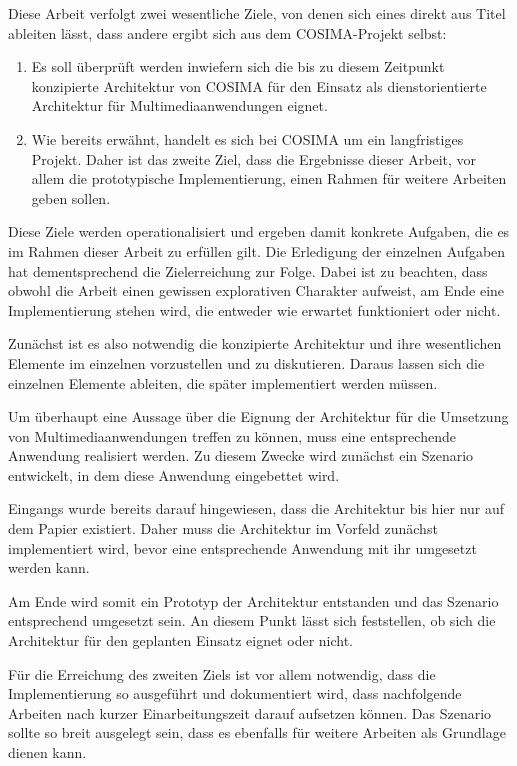   Diese Arbeit verfolgt zwei wesentliche Ziele, von denen sich eines direkt aus Titel ableiten lässt, dass andere ergibt sich aus dem COSIMA-Projekt selbst:

  \begin{enumerate}
    \item Es soll überprüft werden inwiefern sich die bis zu diesem Zeitpunkt konzipierte Architektur von COSIMA für den Einsatz als dienstorientierte Architektur für Multimediaanwendungen eignet. 
    \item Wie bereits erwähnt, handelt es sich bei COSIMA um ein langfristiges Projekt. Daher ist das zweite Ziel, dass die Ergebnisse dieser Arbeit, vor allem die prototypische Implementierung, einen Rahmen für weitere Arbeiten geben sollen.
  \end{enumerate}
  
  Diese Ziele werden operationalisiert und ergeben damit konkrete Aufgaben, die es im Rahmen dieser Arbeit zu erfüllen gilt. Die Erledigung der einzelnen Aufgaben hat dementsprechend die Zielerreichung zur Folge. Dabei ist zu beachten, dass obwohl die Arbeit einen gewissen explorativen Charakter aufweist, am Ende eine Implementierung stehen wird, die entweder wie erwartet funktioniert oder nicht.
  
  Zunächst ist es also notwendig die konzipierte Architektur und ihre wesentlichen Elemente im einzelnen vorzustellen und zu diskutieren. Daraus lassen sich die einzelnen Elemente ableiten, die später implementiert werden müssen.
  
  Um überhaupt eine Aussage über die Eignung der Architektur für die Umsetzung von Multimediaanwendungen treffen zu können, muss eine entsprechende Anwendung realisiert werden. Zu diesem Zwecke wird zunächst ein Szenario entwickelt, in dem diese Anwendung eingebettet wird.
  
  Eingangs wurde bereits darauf hingewiesen, dass die Architektur bis hier nur auf dem Papier existiert. Daher muss die Architektur im Vorfeld zunächst implementiert wird, bevor eine entsprechende Anwendung mit ihr umgesetzt werden kann.
  
  Am Ende wird somit ein Prototyp der Architektur entstanden und das Szenario entsprechend umgesetzt sein. An diesem Punkt lässt sich feststellen, ob sich die Architektur für den geplanten Einsatz eignet oder nicht.
  
  Für die Erreichung des zweiten Ziels ist vor allem notwendig, dass die Implementierung so ausgeführt und dokumentiert wird, dass nachfolgende Arbeiten nach kurzer Einarbeitungszeit darauf aufsetzen können. Das Szenario sollte so breit ausgelegt sein, dass es ebenfalls für weitere Arbeiten als Grundlage dienen kann.
  
